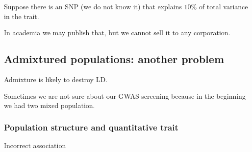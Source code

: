 \documentclass[main.tex]{subfiles}
\begin{document}
Suppose there is an SNP (we do not know it) that explains $ 10 \% $ of total variance in the trait.


In academia we may publish that, but we cannot sell it to any corporation.

\subsection{Admixtured populations: another problem}
Admixture is likely to destroy LD.

Sometimes we are not sure about our GWAS screening because in the beginning we had two mixed population.


\subsubsection{Population structure and quantitative trait}

Incorrect association %
\end{document}
